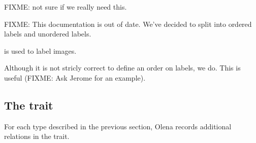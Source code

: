 FIXME: not sure if we really need this.

FIXME: This documentation is out of date.  We've decided to split
 into ordered labels and unordered labels.

 is used to label images.

Although it is not stricly correct to define an order on labels,
we do.  This is useful (FIXME: Ask Jerome for an example).

\subsection{The  trait}

For each type  described in the previous section, Olena
records additional relations in the  trait.

